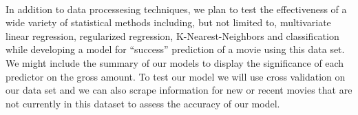 \documentclass{article}
\begin{document}
\\
In addition to data processesing techniques, we plan to test the effectiveness of a wide variety of statistical methods including, but not limited to, multivariate linear regression, regularized regression, K-Nearest-Neighbors and classification while developing a model for ``success'' prediction of a movie using this data set. We might include the summary of our models to display the significance of each predictor on the gross amount. To test our model we will use cross validation on our data set and we can also scrape information for new or recent movies that are not currently in this dataset to assess the accuracy of our model.\\
\end{document}
